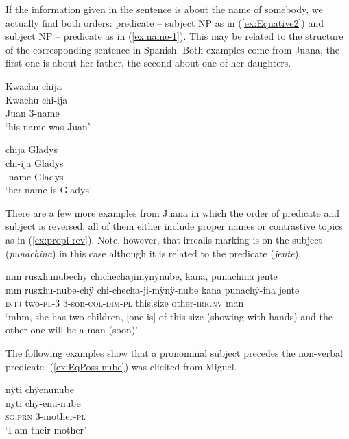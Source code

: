 If the information given in the sentence is about the name of somebody, we actually find both orders: predicate – subject NP as in (\ref{ex:Equative2}) and subject NP – predicate as in (\ref{ex:name-1}). This may be related to the structure of the corresponding sentence in Spanish. Both examples come from Juana, the first one is about her father, the second about one of her daughters.

\ea\label{ex:Equative2}
\begingl 
\glpreamble Kwachu chija\\
\gla Kwachu chi-ija\\ 
\glb Juan 3-name\\ 
\glft ‘his name was Juan’\\ 
\endgl
\trailingcitation{[jxx-p120515l-1.125]}
\xe

\ea\label{ex:name-1}
\begingl
\glpreamble chija Gladys\\
\gla chi-ija Gladys\\
-name Gladys\\
\glft ‘her name is Gladys’
\endgl
\trailingcitation{[jxx-p110923l-2.059]}
\xe

There are a few more examples from Juana in which the order of predicate and subject is reversed, all of them either include proper names or contrastive topics as in (\ref{ex:propi-rev}). Note, however, that irrealis marking is on the subject (\textit{punachina}) in this case although it is related to the predicate (\textit{jente}).

\ea\label{ex:propi-rev}
\begingl
\glpreamble mm rusxhunubechÿ chichechajimÿnÿnube, kana, punachina jente\\
\gla mm rusxhu-nube-chÿ chi-checha-ji-mÿnÿ-nube kana punachÿ-ina jente\\
\glb \textsc{intj} two-\textsc{pl}-3 3-son-\textsc{col}-\textsc{dim}-\textsc{pl} this.size other-\textsc{irr.nv} man\\
\glft ‘mhm, she has two children, [one is] of this size (showing with hands) and the other one will be a man (soon)’
\endgl
\trailingcitation{[jxx-p110923l-1.241]}
\xe

The following examples show that a pronominal subject precedes the non-verbal predicate. (\ref{ex:EqPoss-nube}) was elicited from Miguel.

\ea\label{ex:EqPoss-nube}
\begingl 
\glpreamble nÿti chÿenunube\\
\gla nÿti chÿ-enu-nube\\ 
\textsc{sg.prn} 3-mother-\textsc{pl}\\ 
\glft ‘I am their mother’\\ 
\endgl
\trailingcitation{[mxx-e090728s-3.081]}
\xe

